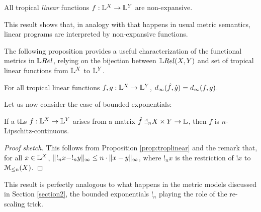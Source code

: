 \begin{proposition}\label{prop:troplinear}
All tropical \emph{linear} functions $f: \mathbb{L}^{X}\to \mathbb{L}^{Y}$ are non-expansive.  
\end{proposition}
This result shows that, in analogy with that happens in usual metric semantics, linear programs are interpreted by non-expansive functions. 

The following proposition provides a useful characterization of the functional metrics in $\LREL$, relying on 
the bijection between $\HOM{\LREL}{X}{Y}$ and set of tropical linear functions from $\mathbb{L}^{X}$ to $\mathbb{L}^{Y}$.

\begin{proposition}
For all tropical linear functions $f,g:\mathbb{L}^{X}\to \mathbb{L}^{Y}$, $d_{\infty}(\hat{f},\hat{g})=d_\infty(f,g)$.%
\end{proposition}

Let us now consider the case of bounded exponentials:
\begin{proposition}\label{prop:boundedlip}
If a tLs $f: \mathbb{L}^{X}\to \mathbb{L}^{Y}$ arises from a matrix $\hat{f}:!_{n}X\times Y\to \mathbb{L}$, then $f$ is $n$-Lipschitz-continuous.
\end{proposition}
\begin{proof}[Proof sketch]
This follows from Proposition \ref{prop:troplinear} and the remark that, for all $x\in \mathbb{L}^{X}$, $\lVert !_{n} x-!_{n} y\rVert_{\infty}\leq n\cdot \lVert x- y\rVert_{\infty}$, where $!_{n} x$ is the restriction of $! x$ to $\mathcal{M}_{\leq n}(X)$.%
\end{proof}
This result is perfectly analogous to what happens in the metric models discussed in Section \ref{section2}, the bounded exponentials $!_{n}$ playing the role of the re-scaling trick.

